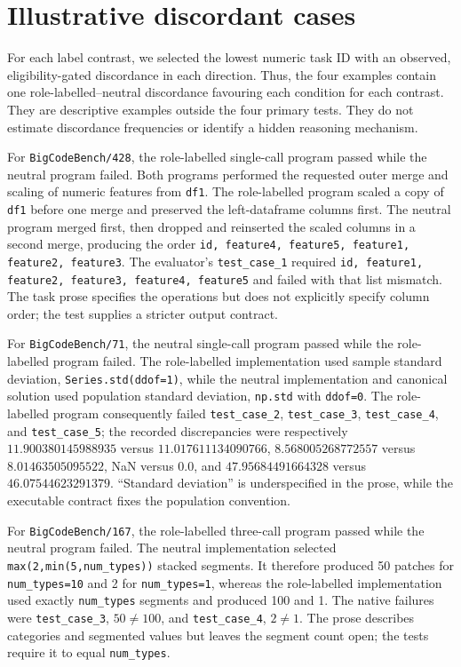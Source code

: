 \section{Illustrative discordant cases}
\label{sec:heldout-cases}

For each label contrast, we selected the lowest numeric task ID with an observed, eligibility-gated discordance in each direction. Thus, the four examples contain one role-labelled--neutral discordance favouring each condition for each contrast. They are descriptive examples outside the four primary tests. They do not estimate discordance frequencies or identify a hidden reasoning mechanism.

For \texttt{BigCodeBench/428}, the role-labelled single-call program passed while the neutral program failed. Both programs performed the requested outer merge and scaling of numeric features from \texttt{df1}. The role-labelled program scaled a copy of \texttt{df1} before one merge and preserved the left-dataframe columns first. The neutral program merged first, then dropped and reinserted the scaled columns in a second merge, producing the order \texttt{id, feature4, feature5, feature1, feature2, feature3}. The evaluator's \texttt{test\_case\_1} required \texttt{id, feature1, feature2, feature3, feature4, feature5} and failed with that list mismatch. The task prose specifies the operations but does not explicitly specify column order; the test supplies a stricter output contract.

For \texttt{BigCodeBench/71}, the neutral single-call program passed while the role-labelled program failed. The role-labelled implementation used sample standard deviation, \texttt{Series.std(ddof=1)}, while the neutral implementation and canonical solution used population standard deviation, \texttt{np.std} with \texttt{ddof=0}. The role-labelled program consequently failed \texttt{test\_case\_2}, \texttt{test\_case\_3}, \texttt{test\_case\_4}, and \texttt{test\_case\_5}; the recorded discrepancies were respectively $11.900380145988935$ versus $11.017611134090766$, $8.568005268772557$ versus $8.01463505095522$, NaN versus $0.0$, and $47.95684491664328$ versus $46.07544623291379$. “Standard deviation” is underspecified in the prose, while the executable contract fixes the population convention.

For \texttt{BigCodeBench/167}, the role-labelled three-call program passed while the neutral program failed. The neutral implementation selected \texttt{max(2,min(5,num\_types))} stacked segments. It therefore produced 50 patches for \texttt{num\_types=10} and 2 for \texttt{num\_types=1}, whereas the role-labelled implementation used exactly \texttt{num\_types} segments and produced 100 and 1. The native failures were \texttt{test\_case\_3}, $50\mathrel{\ne}100$, and \texttt{test\_case\_4}, $2\mathrel{\ne}1$. The prose describes categories and segmented values but leaves the segment count open; the tests require it to equal \texttt{num\_types}.

